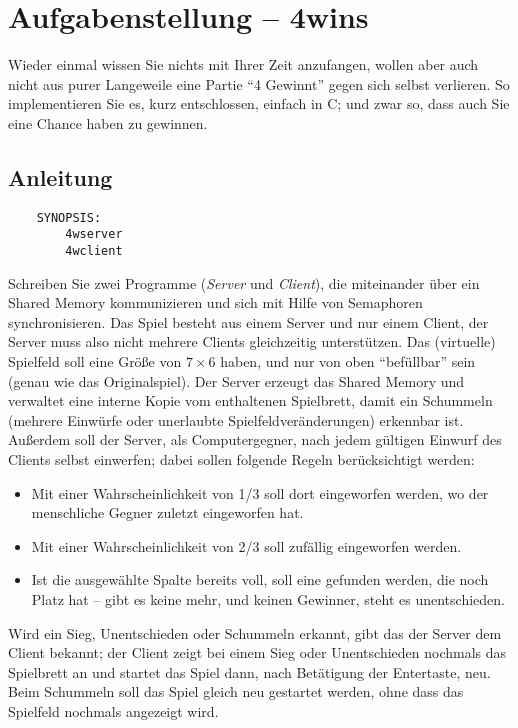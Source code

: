 




\section*{Aufgabenstellung -- 4wins}

Wieder einmal wissen Sie nichts mit Ihrer Zeit anzufangen, wollen aber auch
nicht aus purer Langeweile eine Partie "`4 Gewinnt"' gegen sich selbst
verlieren. So implementieren Sie es, kurz entschlossen, einfach in C; und zwar
so, dass auch Sie eine Chance haben zu gewinnen.

\subsection*{Anleitung}

\begin{verbatim}
    SYNOPSIS:
        4wserver
        4wclient
\end{verbatim}

Schreiben Sie zwei Programme (\emph{Server} und \emph{Client}), die miteinander
über ein Shared Memory kommunizieren und sich mit Hilfe von Semaphoren
synchronisieren. Das Spiel besteht aus einem Server und nur einem Client, der
Server muss also nicht mehrere Clients gleichzeitig unterstützen. Das
(virtuelle) Spielfeld soll eine Größe von $7\times 6$ haben, und nur von oben
"`befüllbar"' sein (genau wie das Originalspiel). Der Server erzeugt das Shared
Memory und verwaltet eine interne Kopie vom enthaltenen Spielbrett, damit ein
Schummeln (mehrere Einwürfe oder unerlaubte Spielfeldveränderungen) erkennbar
ist. Außerdem soll der Server, als Computergegner, nach jedem gültigen Einwurf
des Clients selbst einwerfen; dabei sollen folgende Regeln berücksichtigt
werden:

\begin{itemize}
\item Mit einer Wahrscheinlichkeit von 1/3 soll dort eingeworfen werden, wo der
menschliche Gegner zuletzt eingeworfen hat.
\item Mit einer Wahrscheinlichkeit von 2/3 soll zufällig eingeworfen werden.
\item Ist die ausgewählte Spalte bereits voll, soll eine gefunden werden, die
noch Platz hat -- gibt es keine mehr, und keinen Gewinner, steht es
unentschieden.
\end{itemize}

Wird ein Sieg, Unentschieden oder Schummeln erkannt, gibt das der Server dem
Client bekannt; der Client zeigt bei einem Sieg oder Unentschieden nochmals das
Spielbrett an und startet das Spiel dann, nach Betätigung der Entertaste, neu.
Beim Schummeln soll das Spiel gleich neu gestartet werden, ohne dass das
Spielfeld nochmals angezeigt wird.

